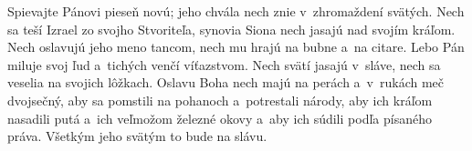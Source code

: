Spievajte Pánovi pieseň novú;
jeho chvála nech znie v~zhromaždení svätých.
\versseparator
Nech sa teší Izrael zo svojho Stvoriteľa,
synovia Siona nech jasajú nad svojím kráľom.
\versseparator
Nech oslavujú jeho meno tancom,
nech mu hrajú na bubne a~na citare.
\versseparator
Lebo Pán miluje svoj ľud
a~tichých venčí víťazstvom.
\versseparator
Nech svätí jasajú v~sláve,
nech sa veselia na svojich lôžkach.
\versseparator
Oslavu Boha nech majú na perách
a~v~rukách meč dvojsečný,
\versseparator
aby sa pomstili na pohanoch
a~potrestali národy,
\versseparator
aby ich kráľom nasadili putá
a~ich veľmožom železné okovy
\versseparator
a~aby ich súdili podľa písaného práva.
Všetkým jeho svätým to bude na slávu.
